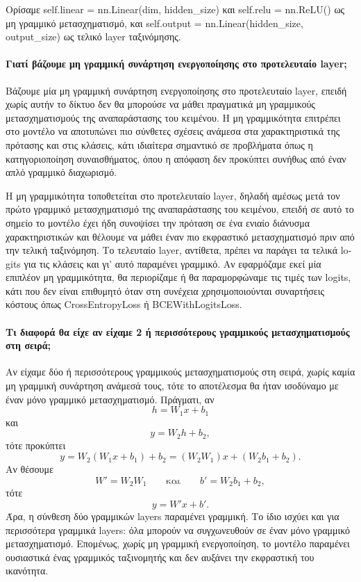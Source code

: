 \documentclass[11pt,a4paper]{article}
\begin{document}

Ορίσαμε \textlatin{self.linear = nn.Linear(dim, hidden\_size)} και \textlatin{self.relu = nn.ReLU()} ως μη γραμμικό μετασχηματισμό, και 
\textlatin{self.output = nn.Linear(hidden\_size, output\_size)} ως τελικό \textlatin{layer} ταξινόμησης.

\paragraph{Γιατί βάζουμε μη γραμμική συνάρτηση ενεργοποίησης στο προτελευταίο \textlatin{layer};}

Βάζουμε μία μη γραμμική συνάρτηση ενεργοποίησης στο προτελευταίο \textlatin{layer}, επειδή χωρίς αυτήν το δίκτυο δεν θα μπορούσε να μάθει 
πραγματικά μη γραμμικούς μετασχηματισμούς της αναπαράστασης του κειμένου. Η μη γραμμικότητα επιτρέπει στο μοντέλο να αποτυπώνει πιο σύνθετες 
σχέσεις ανάμεσα στα χαρακτηριστικά της πρότασης και στις κλάσεις, κάτι ιδιαίτερα σημαντικό σε προβλήματα όπως η κατηγοριοποίηση συναισθήματος, 
όπου η απόφαση δεν προκύπτει συνήθως από έναν απλό γραμμικό διαχωρισμό.

Η μη γραμμικότητα τοποθετείται στο προτελευταίο \textlatin{layer}, δηλαδή αμέσως μετά τον πρώτο γραμμικό μετασχηματισμό της αναπαράστασης του 
κειμένου, επειδή σε αυτό το σημείο το μοντέλο έχει ήδη συνοψίσει την πρόταση σε ένα ενιαίο διάνυσμα χαρακτηριστικών και θέλουμε να μάθει έναν πιο 
εκφραστικό μετασχηματισμό πριν από την τελική ταξινόμηση. Το τελευταίο \textlatin{layer}, αντίθετα, πρέπει να παράγει τα τελικά \textlatin{logits} 
για τις κλάσεις και γι' αυτό παραμένει γραμμικό. Αν εφαρμόζαμε εκεί μία επιπλέον μη γραμμικότητα, θα περιορίζαμε ή θα παραμορφώναμε τις τιμές των 
\textlatin{logits}, κάτι που δεν είναι επιθυμητό όταν στη συνέχεια χρησιμοποιούνται συναρτήσεις κόστους όπως \textlatin{CrossEntropyLoss} ή 
\textlatin{BCEWithLogitsLoss}.

\paragraph{Τι διαφορά θα είχε αν είχαμε 2 ή περισσότερους γραμμικούς μετασχηματισμούς στη σειρά;}

Αν είχαμε δύο ή περισσότερους γραμμικούς μετασχηματισμούς στη σειρά, χωρίς καμία μη γραμμική συνάρτηση ανάμεσά τους, τότε το αποτέλεσμα θα ήταν 
ισοδύναμο με έναν μόνο γραμμικό μετασχηματισμό. Πράγματι, αν
\[
h = W_1 x + b_1
\]
και
\[
y = W_2 h + b_2,
\]
τότε προκύπτει
\[
y = W_2(W_1 x + b_1) + b_2 = (W_2 W_1)x + (W_2 b_1 + b_2).
\]
Αν θέσουμε
\[
W' = W_2 W_1 \qquad \text{και} \qquad b' = W_2 b_1 + b_2,
\]
τότε
\[
y = W' x + b'.
\]
Άρα, η σύνθεση δύο γραμμικών \textlatin{layers} παραμένει γραμμική. Το ίδιο ισχύει και για περισσότερα γραμμικά \textlatin{layers}: όλα μπορούν 
να συγχωνευθούν σε έναν μόνο γραμμικό μετασχηματισμό. Επομένως, χωρίς μη γραμμική ενεργοποίηση, το μοντέλο παραμένει ουσιαστικά ένας γραμμικός 
ταξινομητής και δεν αυξάνει την εκφραστική του ικανότητα.
\end{document}
